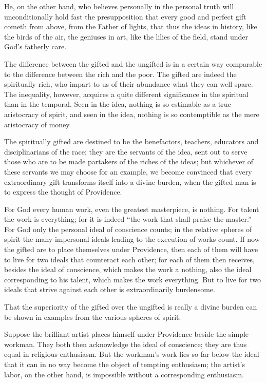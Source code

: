 \documentclass[12pt,a4paper,openany]{book}
\newcommand{\opage}[1]{\marginnote{\footnotesize\textit{[#1]}}}
\begin{document}
He, on the other hand, who believes personally in the
personal truth will unconditionally hold fast the
\setcounter{footnote}{0}%
\opage{65}presupposition that every good and perfect gift
cometh from above, from the Father of lights, that thus the ideas in history, like the birds of
the air, the geniuses in art, like
the lilies of the field, stand under God's fatherly
care.

The difference between the gifted and the ungifted
is in a certain way comparable to the difference
between the rich and the poor. The gifted
are indeed the spiritually rich, who impart to us of
their abundance what they can well spare.
The inequality, however, acquires a quite different significance in the spiritual than in the temporal.
Seen in the idea, nothing is so estimable
as a true aristocracy of spirit, and seen in the idea,
nothing is so contemptible as the mere aristocracy of money.

The spiritually gifted are destined to be
the benefactors, teachers, educators and
disciplinarians of the race; they are the servants of the idea, sent out
to serve those who are to be made partakers
of the riches of the ideas; but whichever of these
servants we may choose for an example, we
become convinced that every extraordinary
gift transforms itself into a divine burden,
\setcounter{footnote}{0}%
\opage{66}when the gifted man is to express the thought
of Providence.

For God every human work, even the
greatest masterpiece, is nothing. For talent the
work is everything; for it is indeed ``the work that shall praise
the master.'' For God only the personal
ideal of conscience counts; in the relative spheres of spirit
the many impersonal ideals leading to the
execution of works count. If now the
gifted are to place themselves under Providence, then
each of them will have to live for
two ideals that counteract each other; for each
of them then receives, besides the ideal of conscience,
which makes the work a nothing, also
the ideal corresponding to his talent,
which makes the work everything. But to live for
two ideals that strive against each other is extraordinarily burdensome.

That the superiority of the gifted over the ungifted
is really a divine burden can be
shown in examples from the various spheres of spirit.

Suppose the brilliant artist places himself
under Providence beside the simple workman. They both then acknowledge the
\setcounter{footnote}{0}%
\opage{67}ideal of conscience; they are thus equal in religious enthusiasm.
But the workman's work lies
so far below the ideal that it can in no way
become the object of tempting enthusiasm;
the artist's labor, on the other hand, is impossible without
a corresponding enthusiasm.
\end{document}
